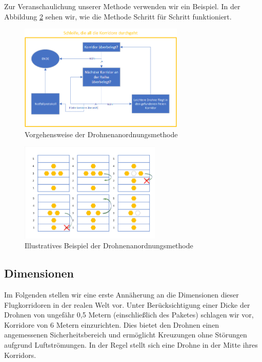 \documentclass[a4paper,titlepage,onecolumn,twoside,12pt]{article}
\begin{document}
Zur Veranschaulichung unserer Methode verwenden wir ein Beispiel. In der Abbildung \ref{fig:drohnenanordnungs_beispiel} sehen wir, wie die Methode Schritt für Schritt funktioniert.

\begin{figure}
\centering
\includegraphics[width = 0.7\textwidth]{Drohnenanordnungsmethode}
\caption{Vorgehensweise der Drohnenanordnungsmethode}
\label{fig:drohnenanordnung}
\end{figure}

\begin{figure}
\centering
\includegraphics[width = 0.6\textwidth]{Drohnenanordnungsmethode_Beispiel}
\caption{Illustratives Beispiel der Drohnenanordnungsmethode}
\label{fig:drohnenanordnungs_beispiel}
\end{figure}

\subsection{Dimensionen}
\label{subsec:dimensionen}

Im Folgenden stellen wir eine erste Annäherung an die Dimensionen dieser Flugkorridoren in der realen Welt vor. Unter Berücksichtigung einer Dicke der Drohnen von ungefähr 0,5 Metern (einschließlich des Paketes) schlagen wir vor, Korridore von 6 Metern einzurichten. Dies bietet den Drohnen einen angemessenen Sicherheitsbereich und ermöglicht Kreuzungen ohne Störungen aufgrund Luftströmungen. In der Regel stellt sich eine Drohne in der Mitte ihres Korridors.
\end{document}
